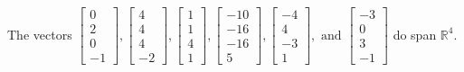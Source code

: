 \begin{exercise}
\begin{exerciseStatement}
  \end{exerciseStatement}
  \begin{exerciseAnswer}
   The vectors \(\left[\begin{array}{r}
0 \\
2 \\
0 \\
-1
\end{array}\right] , \left[\begin{array}{r}
4 \\
4 \\
4 \\
-2
\end{array}\right] , \left[\begin{array}{r}
1 \\
1 \\
4 \\
1
\end{array}\right] , \left[\begin{array}{r}
-10 \\
-16 \\
-16 \\
5
\end{array}\right] , \left[\begin{array}{r}
-4 \\
4 \\
-3 \\
1
\end{array}\right] , \text{ and } \left[\begin{array}{r}
-3 \\
0 \\
3 \\
-1
\end{array}\right]\) 
  	 do  
	span \(\mathbb{R}^4\).
  


  \end{exerciseAnswer}
\end{exercise}